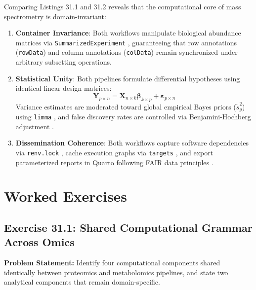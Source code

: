 \documentclass[11pt,twoside,openright]{book}
\begin{document}
Comparing Listings 31.1 and 31.2 reveals that the computational core of mass spectrometry is domain-invariant:
\begin{enumerate}
\item \textbf{Container Invariance}: Both workflows manipulate biological abundance matrices via \texttt{Summarized\allowbreak Experiment} \cite{huber2015orchestrating}, guaranteeing that row annotations (\texttt{rowData}) and column annotations (\texttt{colData}) remain synchronized under arbitrary subsetting operations.
\item \textbf{Statistical Unity}: Both pipelines formulate differential hypotheses using identical linear design matrices:
\begin{equation}
\mathbf{Y}_{p \times n} = \mathbf{X}_{n \times k} \boldsymbol{\beta}_{k \times p} + \boldsymbol{\varepsilon}_{p \times n}
\label{eq:unified_linear_model}
\end{equation}
Variance estimates are moderated toward global empirical Bayes priors ($\tilde{s}_g^2$) using \texttt{limma} \cite{smyth2004limma, ritchie2015limma}, and false discovery rates are controlled via Benjamini-Hochberg adjustment \cite{benjamini1995controlling}.
\item \textbf{Dissemination Coherence}: Both workflows capture software dependencies via \texttt{renv.lock} \cite{ushey2024renv}, cache execution graphs via \texttt{targets} \cite{landau2021targets}, and export parameterized reports in Quarto \cite{allaire2022quarto} following FAIR data principles \cite{wilkinson2016fair}.
\end{enumerate}

\FloatBarrier
\section{Worked Exercises}
\label{sec:worked_exercises}

\subsection*{Exercise 31.1: Shared Computational Grammar Across Omics}
\noindent\textbf{Problem Statement:}\enspace
Identify four computational components shared identically between proteomics and metabolomics pipelines, and state two analytical components that remain domain-specific.
\end{document}
